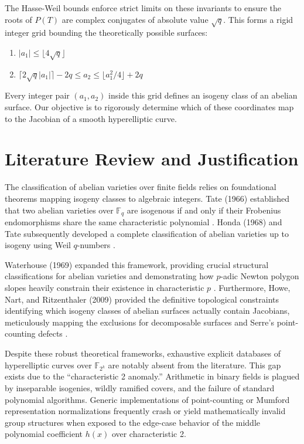 \documentclass[12pt]{article}
\begin{document}
The Hasse-Weil bounds enforce strict limits on these invariants to ensure the roots of $P(T)$ are complex conjugates of absolute value $\sqrt{q}$. This forms a rigid integer grid bounding the theoretically possible surfaces:
\begin{enumerate}
    \item $|a_1| \le \lfloor 4\sqrt{q} \rfloor$
    \item $\lceil 2\sqrt{q}|a_1| \rceil - 2q \le a_2 \le \lfloor a_1^2/4 \rfloor + 2q$
\end{enumerate}
Every integer pair $(a_1, a_2)$ inside this grid defines an isogeny class of an abelian surface. Our objective is to rigorously determine which of these coordinates map to the Jacobian of a smooth hyperelliptic curve.

\section{Literature Review and Justification}
The classification of abelian varieties over finite fields relies on foundational theorems mapping isogeny classes to algebraic integers. Tate (1966) established that two abelian varieties over $\mathbb{F}_q$ are isogenous if and only if their Frobenius endomorphisms share the same characteristic polynomial \cite{Tate1966}. Honda (1968) and Tate subsequently developed a complete classification of abelian varieties up to isogeny using Weil $q$-numbers \cite{Honda1968}. 

Waterhouse (1969) expanded this framework, providing crucial structural classifications for abelian varieties and demonstrating how $p$-adic Newton polygon slopes heavily constrain their existence in characteristic $p$ \cite{Waterhouse1969}. Furthermore, Howe, Nart, and Ritzenthaler (2009) provided the definitive topological constraints identifying which isogeny classes of abelian surfaces actually contain Jacobians, meticulously mapping the exclusions for decomposable surfaces and Serre's point-counting defects \cite{Howe2009}. 

Despite these robust theoretical frameworks, exhaustive explicit databases of hyperelliptic curves over $\mathbb{F}_{2^k}$ are notably absent from the literature. This gap exists due to the ``characteristic 2 anomaly.'' Arithmetic in binary fields is plagued by inseparable isogenies, wildly ramified covers, and the failure of standard polynomial algorithms. Generic implementations of point-counting or Mumford representation normalizations frequently crash or yield mathematically invalid group structures when exposed to the edge-case behavior of the middle polynomial coefficient $h(x)$ over characteristic 2. 
\end{document}
